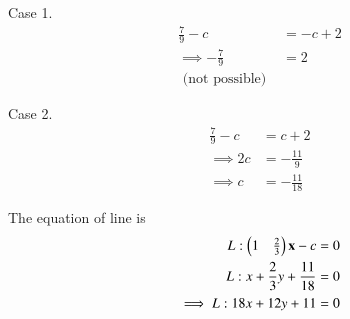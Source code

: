 \documentclass[journal,12pt,twocolumn]{IEEEtran}
\renewcommand{\vec}[1]{\boldsymbol{\mathbf{#1}}}
\begin{document}
Case 1.
\begin{align}
	\frac{7}{9} - {c} &= -{c} + 2\\
    \implies -\frac{7}{9} &= 2\\
    \text{ (not possible) } 
\end{align}

Case 2.
\begin{align}
    \frac{7}{9} - {c} &= {c} + 2\\
    \implies 2{c} &= -\frac{11}{9}\\
    \implies {c} &= -\frac{11}{18}
\end{align}

The equation of line is
\begin{align}
    {L}: \myvec{1&\frac{2}{3}}\vec{x} - c &= 0\\
    {L}: {x} + \frac{2}{3}{y} + \frac{11}{18} &= 0 \\
    \implies {L}: 18{x} + 12{y} + 11 &= 0
\end{align}
\end{document}
